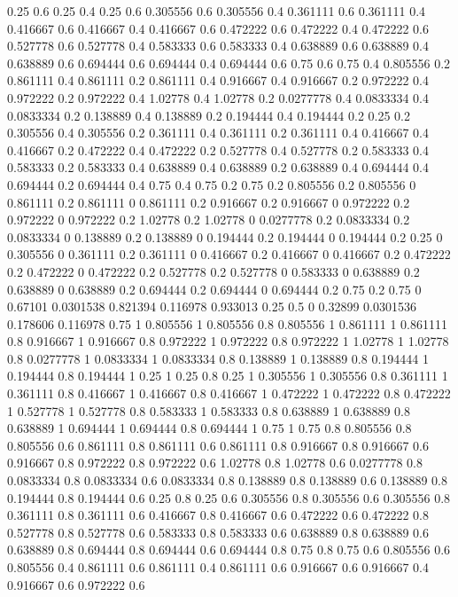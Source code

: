0.25 0.6
0.25 0.4
0.25 0.6
0.305556 0.6
0.305556 0.4
0.361111 0.6
0.361111 0.4
0.416667 0.6
0.416667 0.4
0.416667 0.6
0.472222 0.6
0.472222 0.4
0.472222 0.6
0.527778 0.6
0.527778 0.4
0.583333 0.6
0.583333 0.4
0.638889 0.6
0.638889 0.4
0.638889 0.6
0.694444 0.6
0.694444 0.4
0.694444 0.6
0.75 0.6
0.75 0.4
0.805556 0.2
0.861111 0.4
0.861111 0.2
0.861111 0.4
0.916667 0.4
0.916667 0.2
0.972222 0.4
0.972222 0.2
0.972222 0.4
1.02778 0.4
1.02778 0.2
0.0277778 0.4
0.0833334 0.4
0.0833334 0.2
0.138889 0.4
0.138889 0.2
0.194444 0.4
0.194444 0.2
0.25 0.2
0.305556 0.4
0.305556 0.2
0.361111 0.4
0.361111 0.2
0.361111 0.4
0.416667 0.4
0.416667 0.2
0.472222 0.4
0.472222 0.2
0.527778 0.4
0.527778 0.2
0.583333 0.4
0.583333 0.2
0.583333 0.4
0.638889 0.4
0.638889 0.2
0.638889 0.4
0.694444 0.4
0.694444 0.2
0.694444 0.4
0.75 0.4
0.75 0.2
0.75 0.2
0.805556 0.2
0.805556 0
0.861111 0.2
0.861111 0
0.861111 0.2
0.916667 0.2
0.916667 0
0.972222 0.2
0.972222 0
0.972222 0.2
1.02778 0.2
1.02778 0
0.0277778 0.2
0.0833334 0.2
0.0833334 0
0.138889 0.2
0.138889 0
0.194444 0.2
0.194444 0
0.194444 0.2
0.25 0
0.305556 0
0.361111 0.2
0.361111 0
0.416667 0.2
0.416667 0
0.416667 0.2
0.472222 0.2
0.472222 0
0.472222 0.2
0.527778 0.2
0.527778 0
0.583333 0
0.638889 0.2
0.638889 0
0.638889 0.2
0.694444 0.2
0.694444 0
0.694444 0.2
0.75 0.2
0.75 0
0.67101 0.0301538
0.821394 0.116978
0.933013 0.25
0.5 0
0.32899 0.0301536
0.178606 0.116978
0.75 1
0.805556 1
0.805556 0.8
0.805556 1
0.861111 1
0.861111 0.8
0.916667 1
0.916667 0.8
0.972222 1
0.972222 0.8
0.972222 1
1.02778 1
1.02778 0.8
0.0277778 1
0.0833334 1
0.0833334 0.8
0.138889 1
0.138889 0.8
0.194444 1
0.194444 0.8
0.194444 1
0.25 1
0.25 0.8
0.25 1
0.305556 1
0.305556 0.8
0.361111 1
0.361111 0.8
0.416667 1
0.416667 0.8
0.416667 1
0.472222 1
0.472222 0.8
0.472222 1
0.527778 1
0.527778 0.8
0.583333 1
0.583333 0.8
0.638889 1
0.638889 0.8
0.638889 1
0.694444 1
0.694444 0.8
0.694444 1
0.75 1
0.75 0.8
0.805556 0.8
0.805556 0.6
0.861111 0.8
0.861111 0.6
0.861111 0.8
0.916667 0.8
0.916667 0.6
0.916667 0.8
0.972222 0.8
0.972222 0.6
1.02778 0.8
1.02778 0.6
0.0277778 0.8
0.0833334 0.8
0.0833334 0.6
0.0833334 0.8
0.138889 0.8
0.138889 0.6
0.138889 0.8
0.194444 0.8
0.194444 0.6
0.25 0.8
0.25 0.6
0.305556 0.8
0.305556 0.6
0.305556 0.8
0.361111 0.8
0.361111 0.6
0.416667 0.8
0.416667 0.6
0.472222 0.6
0.472222 0.8
0.527778 0.8
0.527778 0.6
0.583333 0.8
0.583333 0.6
0.638889 0.8
0.638889 0.6
0.638889 0.8
0.694444 0.8
0.694444 0.6
0.694444 0.8
0.75 0.8
0.75 0.6
0.805556 0.6
0.805556 0.4
0.861111 0.6
0.861111 0.4
0.861111 0.6
0.916667 0.6
0.916667 0.4
0.916667 0.6
0.972222 0.6
